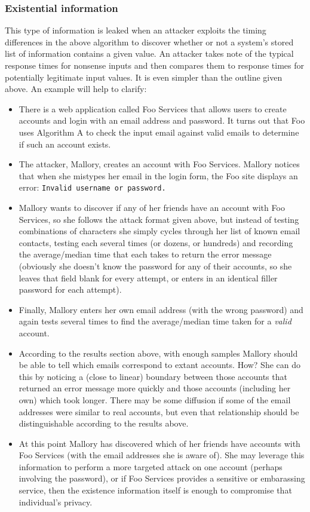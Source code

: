 \documentclass{article}
\providecommand{\tightlist}{
    \setlength{\itemsep}{0pt}\setlength{\parskip}{0pt}
}
\providecommand{\inlinecode}{\texttt}
\begin{document}
\subsubsection{Existential information}
This type of information is leaked when an attacker exploits the timing differences in the above algorithm
to discover whether or not a system's stored list of information contains a given value. An attacker takes note of the typical response times for nonsense inputs and then compares them to response times for potentially legitimate input values. It is even simpler than the outline given above. An example will help to clarify:
\begin{itemize}\tightlist
  \item There is a web application called Foo Services that allows users to create accounts and login with an email address and password. It turns out that Foo uses Algorithm A to check the input email against valid emails to determine if such an account exists.
  \item The attacker, Mallory, creates an account with Foo Services. Mallory notices that when she mistypes her email in the login form, the Foo site displays an error: \inlinecode{Invalid username or password.}
  \item Mallory wants to discover if any of her friends have an account with Foo Services, so she follows the attack format given above, but instead of testing combinations of characters she simply cycles through her list of known email contacts, testing each several times (or dozens, or hundreds) and recording the average/median time that each takes to return the error message (obviously she doesn't know the password for any of their accounts, so she leaves that field blank for every attempt, or enters in an identical filler password for each attempt).
  \item Finally, Mallory enters her own email address (with the wrong password) and again tests several times to find the average/median time taken for a \textit{valid} account.
  \item According to the results section above, with enough samples Mallory should be able to tell which emails correspond to extant accounts. How? She can do this by noticing a (close to linear) boundary between those accounts that returned an error message more quickly and those accounts (including her own) which took longer. There may be some diffusion if some of the email addresses were similar to real accounts, but even that relationship should be distinguishable according to the results above.
  \item At this point Mallory has discovered which of her friends have accounts with Foo Services (with the email addresses she is aware of). She may leverage this information to perform a more targeted attack on one account (perhaps involving the password), or if Foo Services provides a sensitive or embarassing service, then the existence information itself is enough to compromise that individual's privacy.
\end{itemize}
\end{document}
